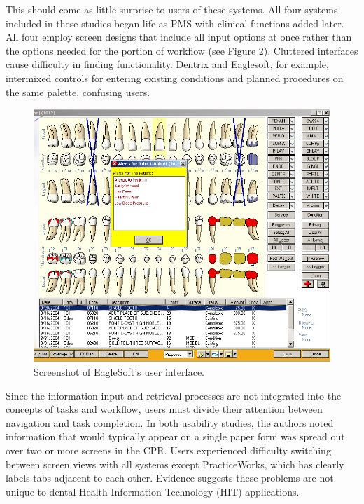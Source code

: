 \documentclass[11pt]{article}
\begin{document}
This should come as little surprise to users of these systems. All four systems included in these studies began life as PMS with clinical functions added later. All four employ screen designs that include all input options at once rather than the options needed for the portion of workflow (see Figure 2). Cluttered interfaces cause difficulty in finding functionality. Dentrix and Eaglesoft, for example, intermixed controls for entering existing conditions and planned procedures on the same palette, confusing users.
\label{fig:2}
\begin{figure}[h!tb]
\begin{center}
\includegraphics[width=\textwidth]{ss1es.png}
\end{center}
\caption{Screenshot of EagleSoft's user interface.}
\end{figure}Since the information input and retrieval processes are not integrated into the concepts of tasks and workflow, users must divide their attention between navigation and task completion. In both usability studies, the authors noted information that would typically appear on a single paper form was spread out over two or more screens in the CPR. Users experienced difficulty switching between screen views with all systems except PracticeWorks, which has clearly labels tabs adjacent to each other. Evidence suggests these problems are not unique to dental Health Information Technology (HIT) applications.\cite{Ash2004Some-unintended,Rose2005Using-qualitati}
\end{document}
